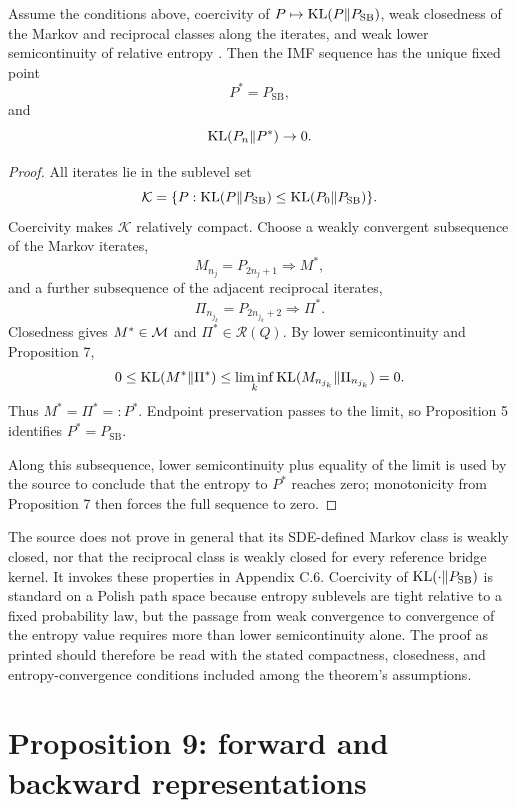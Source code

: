 \begin{theorem}[Theorem 8]
Assume the conditions above, coercivity of \(P\mapsto\mathrm{KL}(P\|P_{\mathrm{SB}})\), weak closedness of the Markov and reciprocal classes along the iterates, and weak lower semicontinuity of relative entropy \cite{vanErvenHarremoes2014}.  Then the IMF sequence has the unique fixed point
\[
 P^*=P_{\mathrm{SB}},
\]
and
\[
 \mathrm{KL}(P_n\|P^*)\to0.
\]
\end{theorem}

\begin{proof}
All iterates lie in the sublevel set
\[
 \mathcal K=\{P:\mathrm{KL}(P\|P_{\mathrm{SB}})
 \le\mathrm{KL}(P_0\|P_{\mathrm{SB}})\}.
\]
Coercivity makes \(\mathcal K\) relatively compact.  Choose a weakly convergent subsequence of the Markov iterates,
\[
 M_{n_j}=P_{2n_j+1}\Rightarrow M^*,
\]
and a further subsequence of the adjacent reciprocal iterates,
\[
 \Pi_{n_{j_k}}=P_{2n_{j_k}+2}\Rightarrow\Pi^*.
\]
Closedness gives \(M^*\in\mathcal{M}\) and \(\Pi^*\in\mathcal R(Q)\).  By lower semicontinuity and Proposition 7,
\[
 0\le\mathrm{KL}(M^*\|\Pi^*)
 \le\liminf_k\mathrm{KL}(M_{n_{j_k}}\|\Pi_{n_{j_k}})=0.
\]
Thus \(M^*=\Pi^*=:P^*\).  Endpoint preservation passes to the limit, so Proposition 5 identifies \(P^*=P_{\mathrm{SB}}\).

Along this subsequence, lower semicontinuity plus equality of the limit is used by the source to conclude that the entropy to \(P^*\) reaches zero; monotonicity from Proposition 7 then forces the full sequence to zero.
\end{proof}

\begin{remark}
The source does not prove in general that its SDE-defined Markov class is weakly closed, nor that the reciprocal class is weakly closed for every reference bridge kernel.  It invokes these properties in Appendix C.6.  Coercivity of \(\mathrm{KL}(\cdot\|P_{\mathrm{SB}})\) is standard on a Polish path space because entropy sublevels are tight relative to a fixed probability law, but the passage from weak convergence to convergence of the entropy value requires more than lower semicontinuity alone.  The proof as printed should therefore be read with the stated compactness, closedness, and entropy-convergence conditions included among the theorem's assumptions.
\end{remark}

\section{Proposition 9: forward and backward representations}


